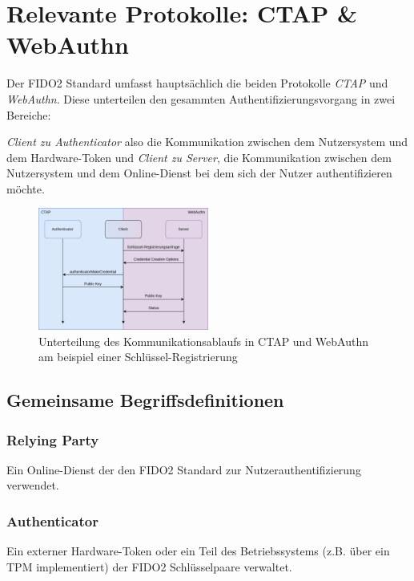 \documentclass[journal]{IEEEtran}
\begin{document}
\section{Relevante Protokolle: CTAP \& WebAuthn}

Der FIDO2 Standard umfasst hauptsächlich die beiden Protokolle \textit{CTAP}
und \textit{WebAuthn}. Diese unterteilen den gesammten
Authentifizierungsvorgang in zwei Bereiche:

\textit{Client zu Authenticator} also die Kommunikation zwischen dem
Nutzersystem und dem Hardware-Token und \textit{Client zu Server}, die
Kommunikation zwischen dem Nutzersystem und dem Online-Dienst bei dem sich der
Nutzer authentifizieren möchte.~\cite{ctapspec, webauthnspec}

\begin{figure}[ht]
	\includegraphics[width=0.5\textwidth]{ctap-webauthn-registration.png}
	\centering
	\caption{Unterteilung des Kommunikationsablaufs in CTAP und WebAuthn am
	beispiel einer Schlüssel-Registrierung}\label{fig:ctap-webauthn}
\end{figure}

\subsection{Gemeinsame Begriffsdefinitionen}

\subsubsection{Relying Party}

Ein Online-Dienst der den FIDO2 Standard zur Nutzerauthentifizierung verwendet.

\subsubsection{Authenticator}

Ein externer Hardware-Token oder ein Teil des Betriebssystems (z.B. über ein
TPM implementiert) der FIDO2 Schlüsselpaare verwaltet.
\end{document}

